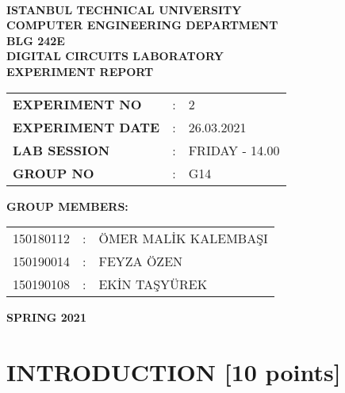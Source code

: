 \documentclass[pdftex,12pt,a4paper]{article}
\begin{document}
\begin{titlepage}
\begin{center}
\textbf{}\\
\textbf{\Large{ISTANBUL TECHNICAL UNIVERSITY}}\\
\vspace{0.5cm}
\textbf{\Large{COMPUTER ENGINEERING DEPARTMENT}}\\
\vspace{2cm}
\textbf{\Large{BLG 242E\\ DIGITAL CIRCUITS LABORATORY\\ EXPERIMENT REPORT}}\\
\vspace{2.8cm}
\begin{table}[ht]
\centering
\Large{
\begin{tabular}{lcl}
\textbf{EXPERIMENT NO}  & : & 2 \\
\textbf{EXPERIMENT DATE}  & : & 26.03.2021 \\
\textbf{LAB SESSION}  & : & FRIDAY - 14.00 \\
\textbf{GROUP NO}  & : & G14 \\
\end{tabular}}
\end{table}
\vspace{1cm}
\textbf{\Large{GROUP MEMBERS:}}\\
\begin{table}[ht]
\centering
\Large{
\begin{tabular}{rcl}
150180112  & : & ÖMER MALİK KALEMBAŞI \\
150190014  & : & FEYZA ÖZEN \\
150190108  & : & EKİN TAŞYÜREK \\
\end{tabular}}
\end{table}
\vspace{2.8cm}
\textbf{\Large{SPRING 2021}}

\end{center}

\end{titlepage}

\thispagestyle{empty}
\setcounter{tocdepth}{4}
\tableofcontents
\clearpage

\setcounter{page}{1}

\section{INTRODUCTION [10 points]}
\end{document}
